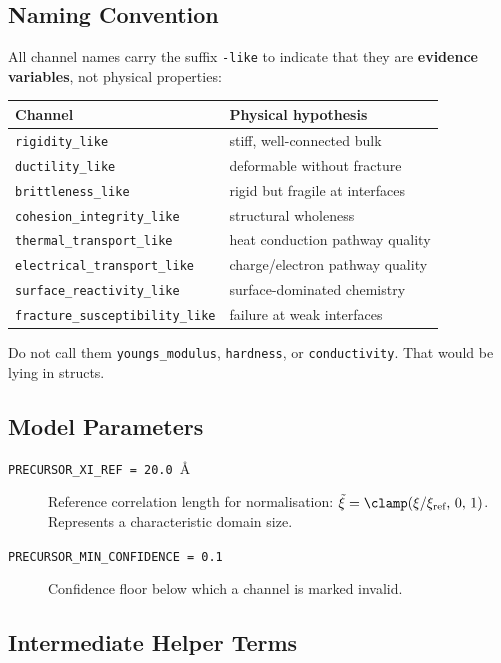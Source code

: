 \documentclass[11pt]{article}
\begin{document}
\subsection{Naming Convention}

All channel names carry the suffix \texttt{-like} to indicate that they
are \textbf{evidence variables}, not physical properties:

\begin{center}
\begin{tabular}{ll}
\textbf{Channel} & \textbf{Physical hypothesis} \\
\hline
\texttt{rigidity\_like}           & stiff, well-connected bulk \\
\texttt{ductility\_like}          & deformable without fracture \\
\texttt{brittleness\_like}        & rigid but fragile at interfaces \\
\texttt{cohesion\_integrity\_like} & structural wholeness \\
\texttt{thermal\_transport\_like}  & heat conduction pathway quality \\
\texttt{electrical\_transport\_like} & charge/electron pathway quality \\
\texttt{surface\_reactivity\_like} & surface-dominated chemistry \\
\texttt{fracture\_susceptibility\_like} & failure at weak interfaces \\
\end{tabular}
\end{center}

Do not call them \texttt{youngs\_modulus}, \texttt{hardness}, or
\texttt{conductivity}.  That would be lying in structs.

\subsection{Model Parameters}

\begin{description}
  \item[\texttt{PRECURSOR\_XI\_REF = 20.0}~\AA]
    Reference correlation length for normalisation:
    $\tilde\xi = \clamp(\xi / \xi_\text{ref},\, 0,\, 1)$.
    Represents a characteristic domain size.
  \item[\texttt{PRECURSOR\_MIN\_CONFIDENCE = 0.1}]
    Confidence floor below which a channel is marked invalid.
\end{description}

\subsection{Intermediate Helper Terms}
\end{document}
